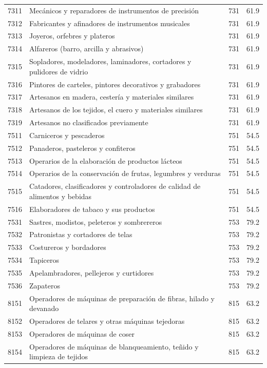 \begin{longtable}{@{}c p{} c r@{}}
7311 & Mecánicos y reparadores de instrumentos de precisión & 731 & 61.9 \\
7312 & Fabricantes y afinadores de instrumentos musicales & 731 & 61.9 \\
7313 & Joyeros, orfebres y plateros & 731 & 61.9 \\
7314 & Alfareros (barro, arcilla y abrasivos) & 731 & 61.9 \\
7315 & Sopladores, modeladores, laminadores, cortadores y pulidores de vidrio & 731 & 61.9 \\
7316 & Pintores de carteles, pintores decorativos y grabadores & 731 & 61.9 \\
7317 & Artesanos en madera, cestería y materiales similares & 731 & 61.9 \\
7318 & Artesanos de los tejidos, el cuero y materiales similares & 731 & 61.9 \\
7319 & Artesanos no clasificados previamente & 731 & 61.9 \\
7511 & Carniceros y pescaderos & 751 & 54.5 \\
7512 & Panaderos, pasteleros y confiteros & 751 & 54.5 \\
7513 & Operarios de la elaboración de productos lácteos & 751 & 54.5 \\
7514 & Operarios de la conservación de frutas, legumbres y verduras & 751 & 54.5 \\
7515 & Catadores, clasificadores y controladores de calidad de alimentos y bebidas & 751 & 54.5 \\
7516 & Elaboradores de tabaco y sus productos & 751 & 54.5 \\
7531 & Sastres, modistos, peleteros y sombrereros & 753 & 79.2 \\
7532 & Patronistas y cortadores de telas & 753 & 79.2 \\
7533 & Costureros y bordadores & 753 & 79.2 \\
7534 & Tapiceros & 753 & 79.2 \\
7535 & Apelambradores, pellejeros y curtidores & 753 & 79.2 \\
7536 & Zapateros & 753 & 79.2 \\
8151 & Operadores de máquinas de preparación de fibras, hilado y devanado & 815 & 63.2 \\
8152 & Operadores de telares y otras máquinas tejedoras & 815 & 63.2 \\
8153 & Operadores de máquinas de coser & 815 & 63.2 \\
8154 & Operadores de máquinas de blanqueamiento, teñido y limpieza de tejidos & 815 & 63.2 \\

\end{longtable}
